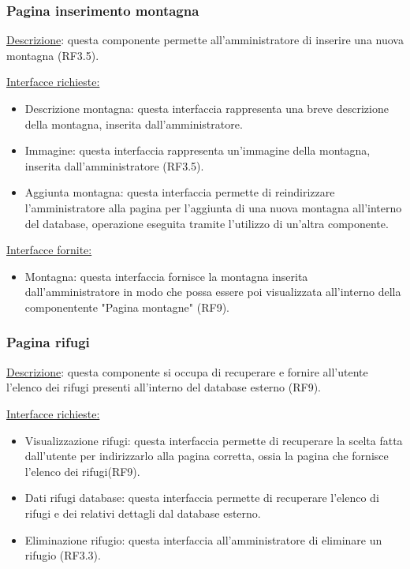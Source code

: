 \documentclass[a4paper,12pt]{article}
\begin{document}
\subsubsection{Pagina inserimento montagna}
\underline{Descrizione}: questa componente permette all'amministratore di inserire una nuova montagna (RF3.5).

\underline{Interfacce richieste:}
\begin{itemize}
\item Descrizione montagna: questa interfaccia rappresenta una breve descrizione della montagna, inserita dall'amministratore.
\item Immagine: questa interfaccia rappresenta un'immagine della montagna, inserita dall'amministratore (RF3.5).
\item Aggiunta montagna: questa interfaccia permette di reindirizzare l'amministratore alla pagina per l'aggiunta di una nuova montagna all'interno del database, operazione eseguita tramite l'utilizzo di un'altra componente.
\end{itemize}

\underline{Interfacce fornite:}
\begin{itemize}
\item Montagna: questa interfaccia fornisce la montagna inserita dall'amministratore in modo che possa essere poi visualizzata all'interno della componentente "Pagina montagne" (RF9).
\end{itemize}



\subsubsection{Pagina rifugi}
\underline{Descrizione}: questa componente si occupa di recuperare e fornire all'utente l'elenco dei rifugi presenti all'interno del database esterno (RF9).

\underline{Interfacce richieste:}
\begin{itemize}
\item Visualizzazione rifugi: questa interfaccia permette di recuperare la scelta fatta dall'utente per indirizzarlo alla pagina corretta, ossia la pagina che fornisce l'elenco dei rifugi(RF9).
\item Dati rifugi database: questa interfaccia permette di recuperare l'elenco di rifugi e dei relativi dettagli dal database esterno.
\item Eliminazione rifugio: questa interfaccia all'amministratore di eliminare un rifugio  (RF3.3).
\end{itemize}
\end{document}
